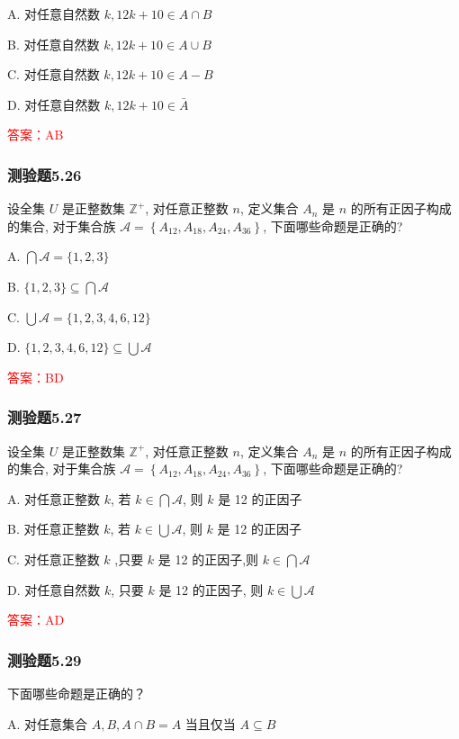 \documentclass[UTF8, heading=true]{ctexart}
\begin{document}
A. 对任意自然数 $k, 12 k+10 \in A \cap B$

B. 对任意自然数 $k, 12 k+10 \in A \cup B$

C. 对任意自然数 $k, 12 k+10 \in A-B$

D. 对任意自然数 $k, 12 k+10 \in \bar{A}$

\textcolor{red}{答案：AB}

\subsubsection{测验题5.26}

设全集 $U$ 是正整数集 $\mathbb{Z}^{+}$, 对任意正整数 $n$, 定义集合 $A_n$ 是 $n$ 的所有正因子构成的集合, 对于集合族 $\mathcal{A}=\left\{A_{12}, A_{18}, A_{24}, A_{36}\right\}$, 下面哪些命题是正确的?

A. $\bigcap \mathcal{A}=\{1,2,3\}$

B. $\{1,2,3\} \subseteq \bigcap \mathcal{A}$

C. $\bigcup \mathcal{A}=\{1,2,3,4,6,12\}$

D. $\{1,2,3,4,6,12\} \subseteq \bigcup \mathcal{A}$

\textcolor{red}{答案：BD}

\subsubsection{测验题5.27}

设全集 $U$ 是正整数集 $\mathbb{Z}^{+}$, 对任意正整数 $n$, 定义集合 $A_n$ 是 $n$ 的所有正因子构成的集合, 对于集合族 $\mathcal{A}=\left\{A_{12}, A_{18}, A_{24}, A_{36}\right\}$, 下面哪些命题是正确的?

A. 对任意正整数 $k$, 若 $k \in \bigcap \mathcal{A}$, 则 $k$ 是 12 的正因子

B. 对任意正整数 $k$, 若 $k \in \bigcup \mathcal{A}$, 则 $k$ 是 12 的正因子

C. 对任意正整数 $k$ ,只要 $k$ 是 12 的正因子,则 $k \in \bigcap \mathcal{A}$

D. 对任意自然数 $k$, 只要 $k$ 是 12 的正因子, 则 $k \in \bigcup \mathcal{A}$

\textcolor{red}{答案：AD}


\subsubsection{测验题5.29}
下面哪些命题是正确的？

A. 对任意集合 $A, B, A \cap B=A$ 当且仅当 $A \subseteq B$
\end{document}
